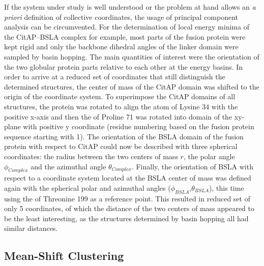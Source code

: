 \documentclass[english, a4paper, 12pt, titlepage, draft]{article}
\begin{document}
If the system under study is well understood or the problem at hand allows an \emph{a priori} definition of collective coordinates, the usage of principal component analysis can be circumvented.
For the determination of local energy minima of the CitAP--BSLA complex for example, most parts of the fusion protein were kept rigid and only the backbone dihedral angles of the linker domain were sampled by basin hopping.
The main quantities of interest were the orientation of the two globular protein parts relative to each other at the energy basins.
In order to arrive at a reduced set of coordinates that still distinguish the determined structures, the center of mass of the CitAP domain was shifted to the origin of the coordinate system.
To superimpose the CitAP domains of all structures, the protein was rotated to align the  atom of Lysine 34 with the positive x-axis and then the  of Proline 71 was rotated into domain of the xy-plane with positive y coordinate (residue numbering based on the fusion protein sequence starting with 1).
The orientation of the BSLA domain of the fusion protein with respect to CitAP could now be described with three spherical coordinates: the radius between the two centers of mass $r$, the polar angle $\phi_{Complex}$ and the azimuthal angle $\theta_{Complex}$.
Finally, the orientation of BSLA with respect to a coordinate system located at the BSLA center of mass was defined again with the spherical polar and azimuthal angles ($\phi_{BSLA}$,$\theta_{BSLA}$), this time using the  of Threonine 199 as a reference point.
This resulted in reduced set of only 5 coordinates, of which the distance of the two centers of mass appeared to be the least interesting, as the structures determined by basin hopping all had similar distances.




\subsection{Mean-Shift Clustering}
\end{document}
